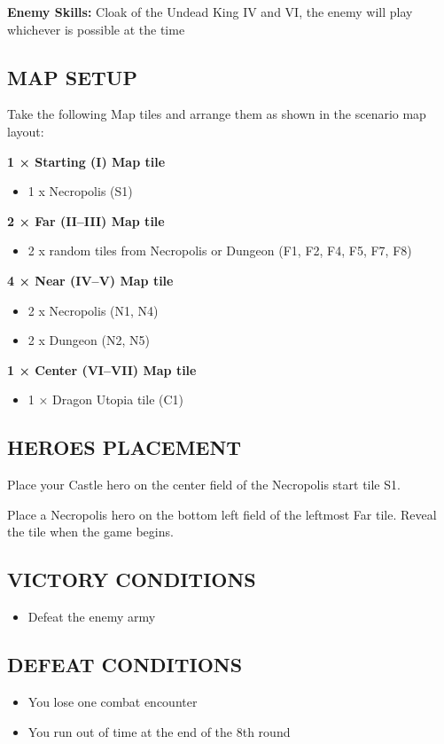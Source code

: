 \begin{multicols*}{2}
\textbf{Enemy Skills:} Cloak of the Undead King IV and VI, the enemy will play whichever is possible at the time

\subsection*{\MakeUppercase{Map setup}}

Take the following Map tiles and arrange them as shown in the scenario map layout:

\textbf{1 × Starting (I) Map tile}
\begin{itemize}
    \item 1 x Necropolis (S1)
\end{itemize}

\textbf{2 × Far (II--III) Map tile}
\begin{itemize}
    \item 2 x random tiles from Necropolis or Dungeon (F1, F2, F4, F5, F7, F8)
\end{itemize}

\textbf{4 × Near (IV--V) Map tile}
\begin{itemize}
    \item 2 x Necropolis (N1, N4)
    \item 2 x Dungeon (N2, N5)
\end{itemize}

\textbf{1 × Center (VI--VII) Map tile}
\begin{itemize}
  \item 1 × Dragon Utopia tile (C1)
\end{itemize}

\subsection*{\MakeUppercase{Heroes placement}}

Place your Castle hero on the center field of the Necropolis start tile S1.

Place a Necropolis hero on the bottom left field of the leftmost Far tile. Reveal the tile when the game begins.

\subsection*{\MakeUppercase{Victory Conditions}}

\begin{itemize}
  \item Defeat the enemy army
\end{itemize}


\subsection*{\MakeUppercase{Defeat Conditions}}
\begin{itemize}
  \item You lose one combat encounter
  \item You run out of time at the end of the 8th round
\end{itemize}
\end{multicols*}

